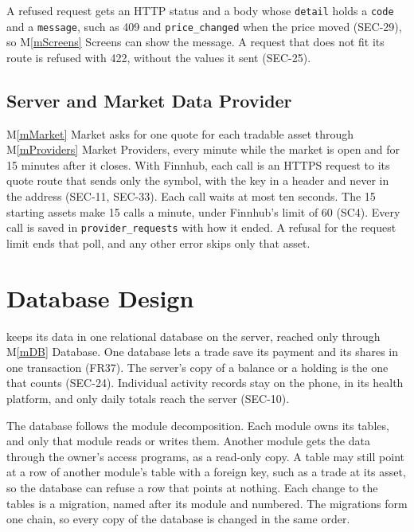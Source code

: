\documentclass[12pt, titlepage]{article}
\newcommand{\mref}[1]{M\ref{#1}}
\begin{document}
A refused request gets an HTTP status and a body whose \texttt{detail} holds a
\texttt{code} and a \texttt{message}, such as 409 and
\texttt{price\_changed} when the price moved (SEC-29), so \mref{mScreens}
Screens can show the message. A request that does not fit its route is refused
with 422, without the values it sent (SEC-25).

\subsection{Server and Market Data Provider}

\mref{mMarket} Market asks for one quote for each tradable asset through
\mref{mProviders} Market Providers, every minute while the market is open and
for 15 minutes after it closes. With Finnhub, each call is an HTTPS request to
its quote route that sends only the symbol, with the key in a header and never
in the address (SEC-11, SEC-33). Each call waits at most ten seconds. The 15
starting assets make 15 calls a minute, under Finnhub's limit of 60 (SC4).
Every call is saved in \texttt{provider\_requests} with how it ended. A
refusal for the request limit ends that poll, and any other error skips only
that asset.

\section{Database Design}  \label{SecDB}


\progname{} keeps its data in one relational database on the server, reached
only through \mref{mDB} Database. One database lets a trade save its payment
and its shares in one transaction (FR37). The server's copy of a balance or a
holding is the one that counts (SEC-24). Individual activity records stay on
the phone, in its health platform, and only daily totals reach the server
(SEC-10).

The database follows the module decomposition. Each module owns its tables, and
only that module reads or writes them. Another module gets the data through the
owner's access programs, as a read-only copy. A table may still point at a row
of another module's table with a foreign key, such as a trade at its asset, so
the database can refuse a row that points at nothing. Each change to the tables
is a migration, named after its module and numbered. The migrations form one
chain, so every copy of the database is changed in the same order.
\end{document}
